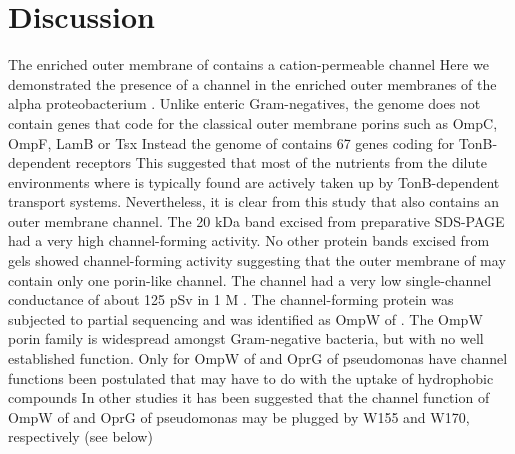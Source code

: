 \section{Discussion}
\label{sec:porin-discussion}
The enriched outer membrane of \caulobacter contains a cation-permeable channel
Here we demonstrated the presence of a channel in the enriched outer membranes of the alpha proteobacterium \caulobacter. Unlike enteric Gram-negatives, the genome does not contain genes that code for the classical outer membrane porins such as OmpC, OmpF, LamB or Tsx Instead the genome of \caulobacter contains 67 genes coding for TonB-dependent receptors This suggested that most of the nutrients from the dilute environments where \caulobacter is typically found are actively taken up by TonB-dependent transport systems. Nevertheless, it is clear from this study that \caulobacter also contains an outer membrane channel. The 20 kDa band excised from preparative \ac{SDS-PAGE} had a very high channel-forming activity. No other protein bands excised from gels showed channel-forming activity suggesting that the outer membrane of \caulobacter may contain only one porin-like channel. The channel had a very low single-channel conductance of about 125 \si{\pico\sievert} in 1 M . The channel-forming protein was subjected to partial sequencing and was identified as OmpW of \caulobacter. The OmpW porin family is widespread amongst Gram-negative bacteria, but with no well established function. Only for OmpW of \ecoli and OprG of \ac{pseudomonas} have channel functions been postulated that may have to do with the uptake of hydrophobic compounds In other studies it has been suggested that the channel function of OmpW of \ecoli and OprG of \ac{pseudomonas} may be plugged by W155 and W170, respectively (see below)

